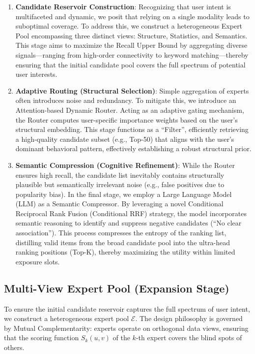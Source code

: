 \begin{enumerate}
    \item \textbf{Candidate Reservoir Construction}: Recognizing that user intent is multifaceted and dynamic, we posit that relying on a single modality leads to suboptimal coverage. To address this, we construct a heterogeneous Expert Pool encompassing three distinct views: Structure, Statistics, and Semantics. This stage aims to maximize the Recall Upper Bound by aggregating diverse signals---ranging from high-order connectivity to keyword matching---thereby ensuring that the initial candidate pool covers the full spectrum of potential user interests.
    
    \item \textbf{Adaptive Routing (Structural Selection)}: Simple aggregation of experts often introduces noise and redundancy. To mitigate this, we introduce an Attention-based Dynamic Router. Acting as an adaptive gating mechanism, the Router computes user-specific importance weights based on the user's structural embedding. This stage functions as a ``Filter'', efficiently retrieving a high-quality candidate subset (e.g., Top-50) that aligns with the user's dominant behavioral pattern, effectively establishing a robust structural prior.
    
    \item \textbf{Semantic Compression (Cognitive Refinement)}: While the Router ensures high recall, the candidate list inevitably contains structurally plausible but semantically irrelevant noise (e.g., false positives due to popularity bias). In the final stage, we employ a Large Language Model (LLM) as a Semantic Compressor. By leveraging a novel Conditional Reciprocal Rank Fusion (Conditional RRF) strategy, the model incorporates semantic reasoning to identify and suppress negative candidates (``No clear association''). This process compresses the entropy of the ranking list, distilling valid items from the broad candidate pool into the ultra-head ranking positions (Top-K), thereby maximizing the utility within limited exposure slots.
\end{enumerate}

\subsection{Multi-View Expert Pool (Expansion Stage)}
\label{subsec:multi_view_expert_pool}

To ensure the initial candidate reservoir captures the full spectrum of user intent, we construct a heterogeneous expert pool $\mathcal{E}$. The design philosophy is governed by Mutual Complementarity: experts operate on orthogonal data views, ensuring that the scoring function $S_{k}\left( u,v \right)$ of the $k$-th expert covers the blind spots of others.

